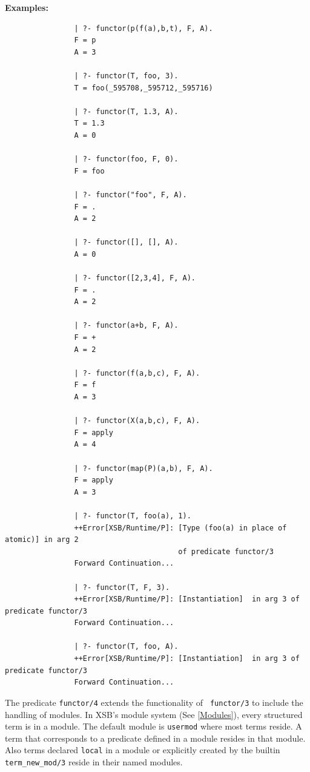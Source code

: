 \begin{description}
{\bf Examples:}
    {\footnotesize
     \begin{verbatim}
                | ?- functor(p(f(a),b,t), F, A).
                F = p
                A = 3

                | ?- functor(T, foo, 3).
                T = foo(_595708,_595712,_595716)

                | ?- functor(T, 1.3, A).
                T = 1.3
                A = 0

                | ?- functor(foo, F, 0).
                F = foo

                | ?- functor("foo", F, A).
                F = .
                A = 2

                | ?- functor([], [], A).
                A = 0

                | ?- functor([2,3,4], F, A).
                F = .
                A = 2

                | ?- functor(a+b, F, A).
                F = +
                A = 2

                | ?- functor(f(a,b,c), F, A).
                F = f
                A = 3

                | ?- functor(X(a,b,c), F, A).
                F = apply
                A = 4

                | ?- functor(map(P)(a,b), F, A).
                F = apply
                A = 3

                | ?- functor(T, foo(a), 1).
                ++Error[XSB/Runtime/P]: [Type (foo(a) in place of atomic)] in arg 2
                                        of predicate functor/3
                Forward Continuation...

                | ?- functor(T, F, 3).
                ++Error[XSB/Runtime/P]: [Instantiation]  in arg 3 of predicate functor/3
                Forward Continuation...

                | ?- functor(T, foo, A).
                ++Error[XSB/Runtime/P]: [Instantiation]  in arg 3 of predicate functor/3
                Forward Continuation...
     \end{verbatim}}

    The predicate {\tt functor/4} extends the functionality of {\tt
      functor/3} to include the handling of modules. In XSB's module
    system (See \ref{Modules}), every structured term is in a module.  The
    default module is {\tt usermod} where most terms reside.  A term
    that corresponds to a predicate defined in a module resides in
    that module.  Also terms declared {\tt local} in a module or
    explicitly created by the builtin {\tt term\_new\_mod/3} reside in
    their named modules.
    

\end{description}
